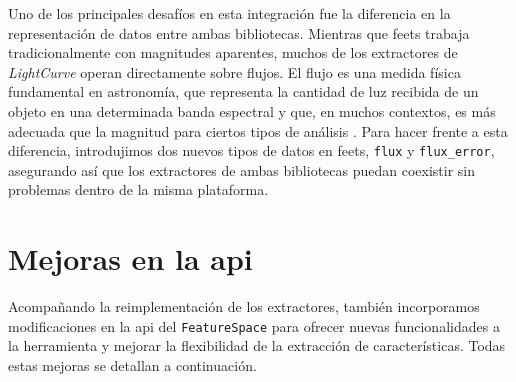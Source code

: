 Uno de los principales desafíos en esta integración fue la diferencia en la representación de datos entre ambas bibliotecas. Mientras que \gls{feets} trabaja tradicionalmente con magnitudes aparentes, muchos de los extractores de \emph{LightCurve} operan directamente sobre flujos. El flujo es una medida física fundamental en astronomía, que representa la cantidad de luz recibida de un objeto en una determinada banda espectral y que, en muchos contextos, es más adecuada que la magnitud para ciertos tipos de análisis \citep{bessell2005standard}. Para hacer frente a esta diferencia, introdujimos dos nuevos tipos de datos en \gls{feets}, \texttt{flux} y \texttt{flux\_error}, asegurando así que los extractores de ambas bibliotecas puedan coexistir sin problemas dentro de la misma plataforma.

\section[Mejoras en la API]{
    Mejoras en la \gls{api}
}

Acompañando la reimplementación de los extractores, también incorporamos modificaciones en la \gls{api} del \texttt{FeatureSpace} para ofrecer nuevas funcionalidades a la herramienta y mejorar la flexibilidad de la extracción de características. Todas estas mejoras se detallan a continuación.

